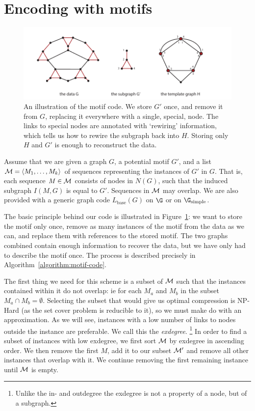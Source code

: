 \section{Encoding with motifs}

\label{section:motif-code}

\begin{figure}[t]
  \includegraphics[width=\textwidth]{./images/illustration.pdf}
  \caption{An illustration of the motif code. We store $G'$ once, and remove it from $G$, replacing it everywhere with a single, special, node. The links to special nodes are annotated with `rewiring' information, which tells us how to rewire the subgraph back into $H$. Storing only $H$ and $G'$ is enough to reconstruct the data.}
  \label{figure:motif-code}
\end{figure}

Assume that we are given a graph $G$, a potential motif $G'$, and a list ${\cal M} = \langle M_1, \ldots, M_k\rangle$ of sequences representing the instances of $G'$ in $G$. That is, each sequence $M\in \cal M$ consists  of nodes in $N(G)$, such that the induced subgraph $I(M, G)$ is equal to $G'$. Sequences in $\cal M$ may overlap. We are also provided with a generic graph code $L_\text{base}(G)$ on $\G$ or on $\G_\text{simple}$. 

The basic principle behind our code is illustrated in Figure~\ref{figure:motif-code}: we want to store the motif only once, remove as many instances of the motif from the data as we can, and replace them with references to the stored motif. The two graphs combined contain enough information to recover the data, but we have only had to describe the motif once. The process is described precisely in Algorithm~\ref{algorithm:motif-code}.   

The first thing we need for this scheme is a subset of $\cal M$ such that the instances contained within it do not overlap: ie for each $M_a$ and $M_b$ in the subset $M_a \cap M_b = \emptyset$. Selecting the subset that would give us optimal compression is NP-Hard (as the set cover problem is reducible to it), so we must make do with an approximation. As we will see, instances with a low number of links to nodes outside the instance are preferable. We call this the \emph{exdegree}. \footnote{Unlike the in- and outdegree the exdegree is not a property of a node, but of a subgraph.} In order to find a subset of instances with low exdegree, we first sort $\cal M$ by exdegree in ascending order. We then remove the first $M$, add it to our subset $\cal M'$ and remove all other instances that overlap with it. We continue removing the first remaining instance until $\cal M$ is empty.

